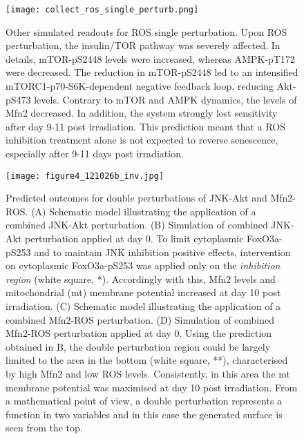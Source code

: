 \begin{figure}[tb]
	\begin{center}
		\texttt{[image: collect\_ros\_single\_perturb.png]}
		\caption[Other simulated readouts for ROS single perturbation]{Other simulated readouts for ROS single perturbation. Upon ROS perturbation, the insulin/TOR pathway was severely affected. In details, mTOR-pS2448 levels were increased, whereas AMPK-pT172 were decreased. The reduction in mTOR-pS2448 led to an intensified mTORC1-p70-S6K-dependent negative feedback loop, reducing Akt-pS473 levels. Contrary to mTOR and AMPK dynamics, the levels of Mfn2 decreased. In addition, the system strongly lost sensitivity after day 9-11 post irradiation. This prediction meant that a ROS inhibition treatment alone is not expected to reverse senescence, especially after 9-11 days post irradiation.}
		\label{fig:project3_collect_ros_single_perturb}
	\end{center}
\end{figure}
\clearpage

\begin{figure}[tb]
	\begin{center}
		\texttt{[image: figure4\_121026b\_inv.jpg]}
		\caption[Predicted outcomes for double perturbations of JNK-Akt and Mfn2-ROS]{Predicted outcomes for double perturbations of JNK-Akt and Mfn2-ROS. (A) Schematic model illustrating the application of a combined JNK-Akt perturbation. (B) Simulation of combined JNK-Akt perturbation applied at day 0. To limit cytoplasmic FoxO3a-pS253 and to maintain JNK inhibition positive effects, intervention on cytoplasmic FoxO3a-pS253 was applied only on the \emph{inhibition region} (white square, *). Accordingly with this, Mfn2 levels and mitochondrial (mt) membrane potential increased at day 10 post irradiation. (C) Schematic model illustrating the application of a combined Mfn2-ROS perturbation. (D) Simulation of combined Mfn2-ROS perturbation applied at day 0. Using the prediction obtained in B, the double perturbation region could be largely limited to the area in the bottom (white square, **), characterised by high Mfn2 and low ROS levels. Consistently, in this area the mt membrane potential was maximised 
at day 10 post irradiation. From a mathematical point of view, a double perturbation represents a function in two variables and in this case the generated surface is seen from the top.}
		\label{fig:project3_figure4_121026c}
	\end{center}
\end{figure}
\clearpage

